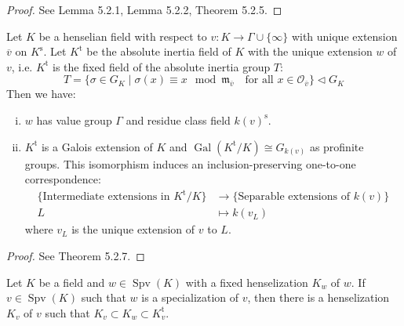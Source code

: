 \begin{proof}
See \cite{EP05} Lemma 5.2.1, Lemma 5.2.2, Theorem 5.2.5.
\end{proof}

\begin{theorem}\label{theorem-absoluteinertia}
Let $K$ be a henselian field with respect to $v: K\to\Gamma\cup\{\infty\}$ with unique extension $\overline{v}$ on $K^\text{s}$. Let $K^\text{t}$ be the absolute inertia field of $K$ with the unique extension $w$ of $v$, i.e. $K^\text{t}$ is the fixed field of the absolute inertia group $T$: 
\[ T = \{ \sigma\in G_K\mid \sigma(x)\equiv x\mod \mathfrak{m}_{\overline{v}} \quad \text{for all }x\in\mathcal{O}_{\overline{v}} \}\lhd G_K \]
Then we have:
\begin{enumerate}[(i)]
\item $w$ has value group $\Gamma$ and residue class field $k(v)^\text{s}$.
\item $K^\text{t}$ is a Galois extension of $K$ and $\operatorname{Gal}(K^\text{t}/K)\cong G_{k(v)}$ as profinite groups. This isomorphism induces an inclusion-preserving one-to-one correspondence: 
\begin{align*}
\{ \text{Intermediate extensions in $K^\text{t}/K$} \} &\longrightarrow \{\text{Separable extensions of $k(v)$} \}\\ 
L &\longmapsto k(v_L)  
\end{align*}
where $v_L$ is the unique extension of $v$ to $L$.
\end{enumerate}
\end{theorem}

\begin{proof}
See \cite{EP05} Theorem 5.2.7.
\end{proof}

\begin{lemma}\label{lemma-henselization-specialization}
Let $K$ be a field and $w\in\operatorname{Spv}(K)$ with a fixed henselization $K_w$ of $w$. If $v\in\operatorname{Spv}(K)$ such that $w$ is a specialization of $v$, then there is a henselization $K_v$ of $v$ such that $K_v\subset K_w\subset K_v^\text{t}$.
\end{lemma}

